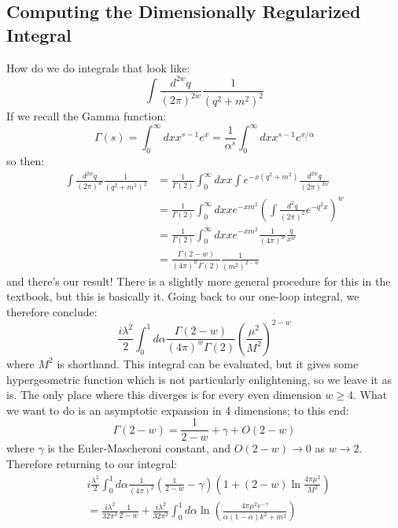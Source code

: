 \subsection{Computing the Dimensionally Regularized Integral}
How do we do integrals that look like:
\begin{equation}
    \int \frac{d^{2w}q}{(2\pi)^{2w}}\frac{1}{(q^2 + m^2)^2}
\end{equation}
If we recall the Gamma function:
\begin{equation}
    \Gamma(s) = \int_0^\infty dx x^{s-1}e^x = \frac{1}{\alpha^s}\int_0^\infty dx x^{s-1}e^{x/\alpha}
\end{equation}
so then:
\begin{equation}
    \begin{split}
        \int \frac{d^{2w}q}{(2\pi)^{w}}\frac{1}{(q^2 + m^2)^2} &= \frac{1}{\Gamma(2)}\int_0^\infty dx x\int e^{-x(q^2 + m^2)} \frac{d^{2w}q}{(2\pi)^{2w}}
        \\ &= \frac{1}{\Gamma(2)}\int_0^\infty dx x e^{-xm^2}\left(\int \frac{d^2q}{(2\pi)^2} e^{-q^2 x}\right)^w
        \\ &= \frac{1}{\Gamma(2)}\int_0^\infty dx x e^{-x m^2}\frac{1}{(4\pi)^w}\frac{q}{x^w}
        \\ &= \frac{\Gamma(2-w)}{(4\pi)^w \Gamma(2)}\frac{1}{(m^2)^{2-w}}
    \end{split}
\end{equation}
and there's our result! There is a slightly more general procedure for this in the textbook, but this is basically it. Going back to our one-loop integral, we therefore conclude:
\begin{equation}
    \frac{i\lambda^2}{2}\int_0^1d\alpha \frac{\Gamma(2-w)}{(4\pi)^w \Gamma(2)}\left(\frac{\mu^2}{M^2}\right)^{2-w}
\end{equation}
where $M^2$ is shorthand. This integral can be evaluated, but it gives some hypergeometric function which is not particularly enlightening, so we leave it as is. The only place where this diverges is for every even dimension $w \geq 4$. What we want to do is an asymptotic expansion in 4 dimensions; to this end:
\begin{equation}
    \Gamma(2 - w) = \frac{1}{2-w} + \gamma + O(2-w)
\end{equation}
where $\gamma$ is the Euler-Mascheroni constant, and $O(2-w) \to 0$ as $w \to 2$. Therefore returning to our integral:
\begin{equation}
    \begin{split}
        &i\frac{\lambda^2}{2}\int_0^1 d\alpha \frac{1}{(4\pi)^2}\left(\frac{1}{2- w} - \gamma\right) \left(1 + (2 - w)\ln \frac{4\pi \mu^2}{M^2}\right) 
        \\ &= \frac{i\lambda^2}{32\pi^2}\frac{1}{2-w} + \frac{i\lambda^2}{32\pi^2}\int_0^1 d\alpha \ln(\frac{4\pi \mu^2 e^{-\gamma}}{\alpha(1-\alpha)k^2 + m^2})
    \end{split}
\end{equation}
